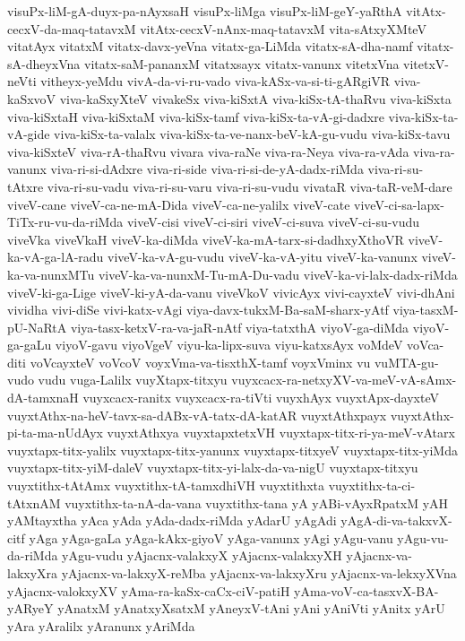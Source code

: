 {visuPx-liM-gA-duyx-pa-nAyxsaH
visuPx-liMga
visuPx-liM-geY-yaRthA
vitAtx-cecxV-da-maq-tatavxM
vitAtx-cecxV-nAnx-maq-tatavxM
vita-sAtxyXMteV
vitatAyx
vitatxM
vitatx-davx-yeVna
vitatx-ga-LiMda
vitatx-sA-dha-namf
vitatx-sA-dheyxVna
vitatx-saM-pananxM
vitatxsayx
vitatx-vanunx
vitetxVna
vitetxV-neVti
vitheyx-yeMdu
vivA-da-vi-ru-vado
viva-kASx-va-si-ti-gARgiVR
viva-kaSxvoV
viva-kaSxyXteV
vivakeSx
viva-kiSxtA
viva-kiSx-tA-thaRvu
viva-kiSxta
viva-kiSxtaH
viva-kiSxtaM
viva-kiSx-tamf
viva-kiSx-ta-vA-gi-dadxre
viva-kiSx-ta-vA-gide
viva-kiSx-ta-valalx
viva-kiSx-ta-ve-nanx-beV-kA-gu-vudu
viva-kiSx-tavu
viva-kiSxteV
viva-rA-thaRvu
vivara
viva-raNe
viva-ra-Neya
viva-ra-vAda
viva-ra-vanunx
viva-ri-si-dAdxre
viva-ri-side
viva-ri-si-de-yA-dadx-riMda
viva-ri-su-tAtxre
viva-ri-su-vadu
viva-ri-su-varu
viva-ri-su-vudu
vivataR
viva-taR-veM-dare
viveV-cane
viveV-ca-ne-mA-Dida
viveV-ca-ne-yalilx
viveV-cate
viveV-ci-sa-lapx-TiTx-ru-vu-da-riMda
viveV-cisi
viveV-ci-siri
viveV-ci-suva
viveV-ci-su-vudu
viveVka
viveVkaH
viveV-ka-diMda
viveV-ka-mA-tarx-si-dadhxyXthoVR
viveV-ka-vA-ga-lA-radu
viveV-ka-vA-gu-vudu
viveV-ka-vA-yitu
viveV-ka-vanunx
viveV-ka-va-nunxMTu
viveV-ka-va-nunxM-Tu-mA-Du-vadu
viveV-ka-vi-lalx-dadx-riMda
viveV-ki-ga-Lige
viveV-ki-yA-da-vanu
viveVkoV
vivicAyx
vivi-cayxteV
vivi-dhAni
vividha
vivi-diSe
vivi-katx-vAgi
viya-davx-tukxM-Ba-saM-sharx-yAtf
viya-tasxM-pU-NaRtA
viya-tasx-ketxV-ra-va-jaR-nAtf
viya-tatxthA
viyoV-ga-diMda
viyoV-ga-gaLu
viyoV-gavu
viyoVgeV
viyu-ka-lipx-suva
viyu-katxsAyx
voMdeV
voVca-diti
voVcayxteV
voVcoV
voyxVma-va-tisxthX-tamf
voyxVminx
vu
vuMTA-gu-vudo
vudu
vuga-Lalilx
vuyXtapx-titxyu
vuyxcacx-ra-netxyXV-va-meV-vA-sAmx-dA-tamxnaH
vuyxcacx-ranitx
vuyxcacx-ra-tiVti
vuyxhAyx
vuyxtApx-dayxteV
vuyxtAthx-na-heV-tavx-sa-dABx-vA-tatx-dA-katAR
vuyxtAthxpayx
vuyxtAthx-pi-ta-ma-nUdAyx
vuyxtAthxya
vuyxtapxtetxVH
vuyxtapx-titx-ri-ya-meV-vAtarx
vuyxtapx-titx-yalilx
vuyxtapx-titx-yanunx
vuyxtapx-titxyeV
vuyxtapx-titx-yiMda
vuyxtapx-titx-yiM-daleV
vuyxtapx-titx-yi-lalx-da-va-nigU
vuyxtapx-titxyu
vuyxtithx-tAtAmx
vuyxtithx-tA-tamxdhiVH
vuyxtithxta
vuyxtithx-ta-ci-tAtxnAM
vuyxtithx-ta-nA-da-vana
vuyxtithx-tana
yA
yABi-vAyxRpatxM
yAH
yAMtayxtha
yAca
yAda
yAda-dadx-riMda
yAdarU
yAgAdi
yAgA-di-va-takxvX-citf
yAga
yAga-gaLa
yAga-kAkx-giyoV
yAga-vanunx
yAgi
yAgu-vanu
yAgu-vu-da-riMda
yAgu-vudu
yAjacnx-valakxyX
yAjacnx-valakxyXH
yAjacnx-va-lakxyXra
yAjacnx-va-lakxyX-reMba
yAjacnx-va-lakxyXru
yAjacnx-va-lekxyXVna
yAjacnx-valokxyXV
yAma-ra-kaSx-caCx-ciV-patiH
yAma-voV-ca-tasxvX-BA-yARyeY
yAnatxM
yAnatxyXsatxM
yAneyxV-tAni
yAni
yAniVti
yAnitx
yArU
yAra
yAralilx
yAranunx
yAriMda
}
